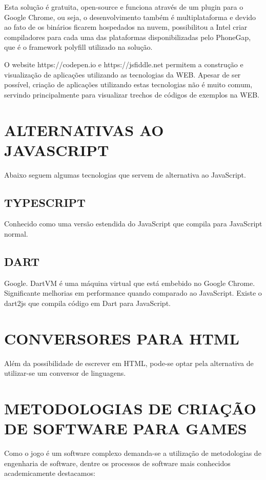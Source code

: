 Esta solução é gratuita, open-source e funciona através de um
plugin para o Google Chrome, ou seja, o desenvolvimento também é
multiplataforma e devido ao fato de os binários ficarem hospedados
na nuvem, possibilitou a Intel criar compiladores para cada uma das
plataformas disponibilizadas pelo PhoneGap, que é o framework polyfill
utilizado na solução.

O website https://codepen.io e https://jsfiddle.net permitem a construção e visualização de aplicações utilizando as tecnologias da WEB. Apesar de ser possível, criação de aplicações utilizando estas tecnologias não é muito comum, servindo principalmente para visualizar trechos de códigos de exemplos na WEB.

\chapter{ALTERNATIVAS AO JAVASCRIPT}

Abaixo seguem algumas tecnologias que servem de alternativa ao
JavaScript.

\section{TYPESCRIPT}

Conhecido como uma versão estendida do JavaScript que compila para
JavaScript normal.

\section{DART}

Google. DartVM é uma máquina virtual que está embebido no Google
Chrome. Significante melhorias em performance quando comparado
ao JavaScript. Existe o dart2js que compila código em Dart para
JavaScript.

\chapter{CONVERSORES PARA HTML}

Além da possibilidade de escrever em HTML, pode-se optar pela
alternativa de utilizar-se um conversor de linguagens.

\chapter{METODOLOGIAS DE CRIAÇÃO DE SOFTWARE PARA GAMES}

Como o jogo é um software complexo demanda-se a utilização de
metodologias de engenharia de software, dentre os processos de software
mais conhecidos academicamente destacamos:

